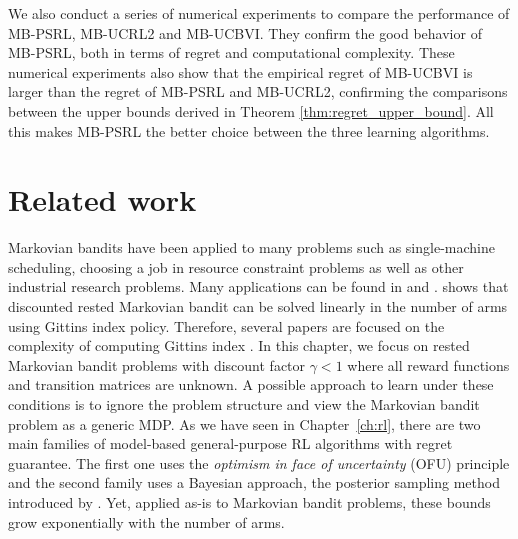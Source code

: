 We also conduct a series of numerical experiments to compare the performance of MB-PSRL,  MB-UCRL2 and MB-UCBVI.  They confirm the good behavior of MB-PSRL, both in terms of regret and computational complexity. These numerical experiments also show that the empirical regret of MB-UCBVI is larger than the regret of MB-PSRL and MB-UCRL2, confirming the comparisons between the upper bounds derived in Theorem \ref{thm:regret_upper_bound}. All this  makes MB-PSRL the better choice between the three learning algorithms.

\section{Related work}
\label{ch:rested:related}

Markovian bandits have been applied to many problems such as single-machine scheduling, choosing a job in  resource constraint problems  as well as other  industrial research problems. Many applications can be found in \cite[Section 3.6]{puterman2014markov} and \cite{gittins2011multi}. \cite{gittins1979bandit} shows that discounted rested Markovian bandit can be solved linearly in the number of arms using Gittins index policy. Therefore, several papers are   focused  on the complexity of  computing  Gittins index \cite{chakravorty2014multi,gast2022computing}.
In this chapter, we focus on rested Markovian bandit problems with discount factor $\gamma<1$ where all
reward functions and transition matrices are unknown.
A possible approach to learn under these conditions is to ignore the problem structure and view the Markovian bandit problem as a generic MDP.
As we have seen in Chapter~\ref{ch:rl}, there are two main families of model-based general-purpose RL algorithms with regret guarantee. The first one uses the \emph{optimism in face of uncertainty} (OFU) principle and the second family uses a Bayesian approach, the posterior sampling method introduced by \cite{thompson1933likelihood}.
Yet, applied as-is to Markovian bandit problems, these bounds grow exponentially with the number of arms.


